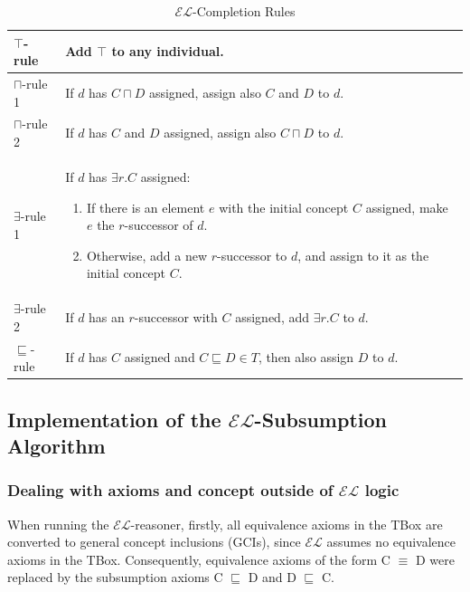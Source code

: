 \documentclass[a4paper]{article}
\theoremstyle{plain}
\theoremstyle{definition}
\begin{document}
\begin{table}[ht]
    \centering
    \caption{$\mathcal{EL}$-Completion Rules}
    \begin{tabular}{|l|p{}|}
        \hline
        $\top$-rule & Add $\top$ to any individual. \\
        \hline
        $\sqcap$-rule 1 & If $d$ has $C \sqcap D$ assigned, assign also $C$ and $D$ to $d$. \\
        \hline
        $\sqcap$-rule 2 & If $d$ has $C$ and $D$ assigned, assign also $C \sqcap D$ to $d$. \\
        \hline
        $\exists$-rule 1 & If $d$ has $\exists r.C$ assigned:
                           \begin{enumerate}
                               \item If there is an element $e$ with the initial concept $C$ assigned, make $e$ the $r$-successor of $d$.
                               \item Otherwise, add a new $r$-successor to $d$, and assign to it as the initial concept $C$.
                           \end{enumerate} \\
        \hline
        $\exists$-rule 2 & If $d$ has an $r$-successor with $C$ assigned, add $\exists r.C$ to $d$. \\
        \hline
        $\sqsubseteq$-rule & If $d$ has $C$ assigned and $C \sqsubseteq D \in T$, then also assign $D$ to $d$. \\
        \hline
    \end{tabular}
    \label{ELrules}
\end{table}

    \subsection{Implementation of the $\mathcal{EL}$-Subsumption Algorithm}
    
    \subsubsection{Dealing with axioms and concept outside of $\mathcal{EL}$ logic}
    
    When running the $\mathcal{EL}$-reasoner, firstly, all equivalence axioms in the TBox are converted to general concept inclusions (GCIs), since $\mathcal{EL}$ assumes no equivalence axioms in the TBox. Consequently, equivalence axioms of the form C $\equiv$ D were replaced by the subsumption axioms C $\sqsubseteq$ D and D $\sqsubseteq$ C.
\end{document}
